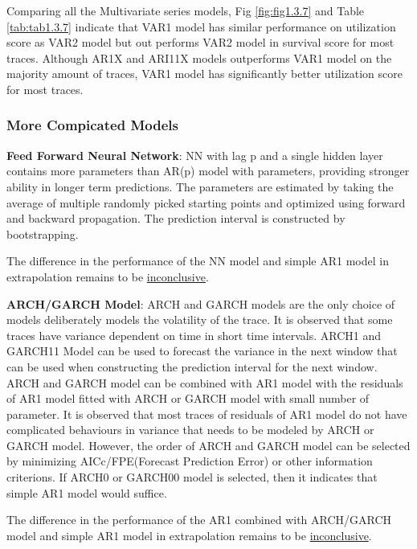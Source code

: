 \documentclass{article}
\begin{document}
\begin{flushleft}
Comparing all the Multivariate series models, Fig \ref{fig:fig1.3.7} and Table \ref{tab:tab1.3.7} indicate that VAR1 model has similar performance on utilization score as VAR2 model but out performs VAR2 model in survival score for most traces. Although AR1X and ARI11X models outperforms VAR1 model on the majority amount of traces, VAR1 model has significantly better utilization score for most traces.
\end{flushleft}

\subsubsection{More Compicated Models}

\begin{flushleft}
\textbf{Feed Forward Neural Network}: NN with lag p and a single hidden layer contains more parameters than AR(p) model with parameters, providing stronger ability in longer term predictions. The parameters are estimated by taking the average of multiple randomly picked starting points and optimized using forward and backward propagation. The prediction interval is constructed by bootstrapping. 

The difference in the performance of the NN model and simple AR1 model in extrapolation remains to be \underline{inconclusive}.
\end{flushleft}

\begin{flushleft}
\textbf{ARCH/GARCH Model}: ARCH and GARCH models are the only choice of models deliberately models the volatility of the trace. It is observed that some traces have variance dependent on time in short time intervals. ARCH1 and GARCH11 Model can be used to forecast the variance in the next window that can be used when constructing the prediction interval for the next window. ARCH and GARCH model can be combined with AR1 model with the residuals of AR1 model fitted with ARCH or GARCH model with small number of parameter. It is observed that most traces of residuals of AR1 model do not have complicated behaviours in variance that needs to be modeled by ARCH or GARCH model. However, the order of ARCH and GARCH model can be selected by minimizing AICc/FPE(Forecast Prediction Error) or other information criterions. If ARCH0 or GARCH00 model is selected, then it indicates that simple AR1 model would suffice. 

The difference in the performance of the AR1 combined with ARCH/GARCH model and simple AR1 model in extrapolation remains to be \underline{inconclusive}.
\end{flushleft}
\end{document}
